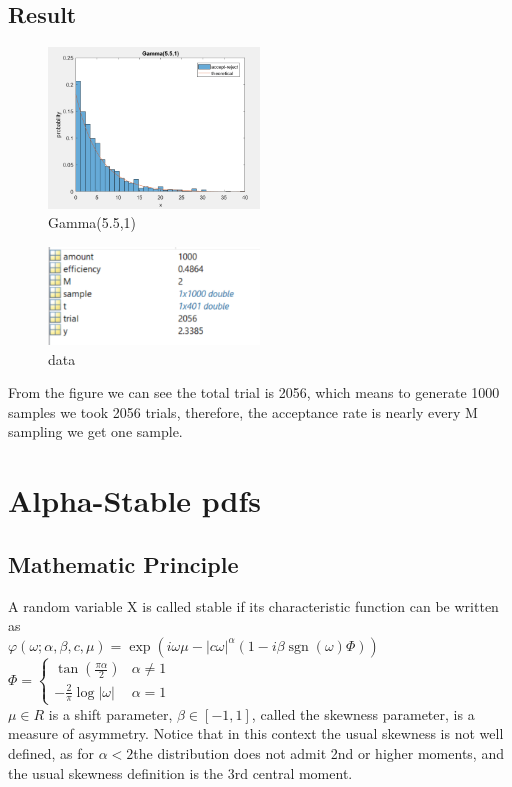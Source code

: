 \documentclass[twoside]{article}
\begin{document}
\begin{multicols*}{2}
\subsection{\normalsize{Result}}
\begin{figure}[H]
   \centering
   \includegraphics[width = 0.5\textwidth]{../data/gamma55.png}  
   \caption{Gamma(5.5,1)}
\end{figure}
\begin{figure}[H]
   \centering
   \includegraphics[width = 0.5\textwidth]{../data/datasolution2.png}  
   \caption{data}
\end{figure}
From the figure we can see the total trial is 2056, which means to generate 1000 samples we took 2056 trials, therefore, the acceptance rate is nearly every M sampling we get one sample.\\

\section{Alpha-Stable pdfs}
\subsection{\normalsize{Mathematic Principle}}
A random variable X is called stable if its characteristic function can be written as\\
${\displaystyle \varphi (\omega;\alpha ,\beta ,c,\mu )=\exp \left(i\omega\mu -|c\omega|^{\alpha }\left(1-i\beta \operatorname {sgn}(\omega)\Phi \right)\right)} $
${\displaystyle \Phi ={\begin{cases}\tan \left({\frac {\pi \alpha }{2}}\right)&\alpha \neq 1\\-{\frac {2}{\pi }}\log |\omega|&\alpha =1\end{cases}}}$\\
$\mu \in R$ is a shift parameter, $\beta \in [-1,1]$, called the skewness parameter, is a measure of asymmetry. Notice that in this context the usual skewness is not well defined, as for $\alpha < 2$the distribution does not admit 2nd or higher moments, and the usual skewness definition is the 3rd central moment.\\


\end{multicols*}
\end{document}
